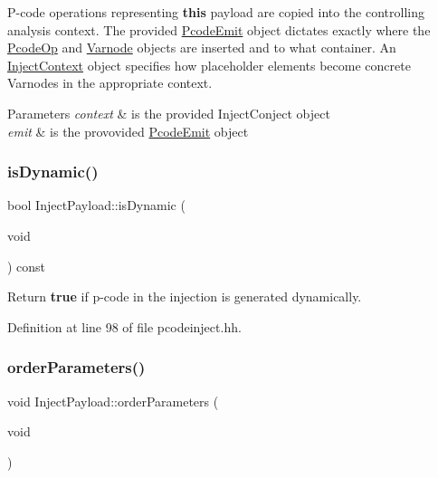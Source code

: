 P-\/code operations representing {\bfseries{this}} payload are copied into the controlling analysis context. The provided \mbox{\hyperlink{class_pcode_emit}{Pcode\+Emit}} object dictates exactly where the \mbox{\hyperlink{class_pcode_op}{Pcode\+Op}} and \mbox{\hyperlink{class_varnode}{Varnode}} objects are inserted and to what container. An \mbox{\hyperlink{class_inject_context}{Inject\+Context}} object specifies how placeholder elements become concrete Varnodes in the appropriate context. 
\begin{DoxyParams}{Parameters}
{\em context} & is the provided Inject\+Conject object \\
\hline
{\em emit} & is the provovided \mbox{\hyperlink{class_pcode_emit}{Pcode\+Emit}} object \\
\hline
\end{DoxyParams}
\mbox{\label{class_inject_payload_ab8b97f98305f0175df23f2b9733b0afa}} 
\subsubsection{\texorpdfstring{isDynamic()}{isDynamic()}}
{\footnotesize\ttfamily bool Inject\+Payload\+::is\+Dynamic (\begin{DoxyParamCaption}\item[{void}]{ }\end{DoxyParamCaption}) const\hspace{0.3cm}{\ttfamily [inline]}}



Return {\bfseries{true}} if p-\/code in the injection is generated dynamically. 



Definition at line 98 of file pcodeinject.\+hh.

\mbox{\label{class_inject_payload_ad9ff2141b50a358375dd5cd5df63c3f0}} 
\subsubsection{\texorpdfstring{orderParameters()}{orderParameters()}}
{\footnotesize\ttfamily void Inject\+Payload\+::order\+Parameters (\begin{DoxyParamCaption}\item[{void}]{ }\end{DoxyParamCaption})\hspace{0.3cm}{\ttfamily [protected]}}



